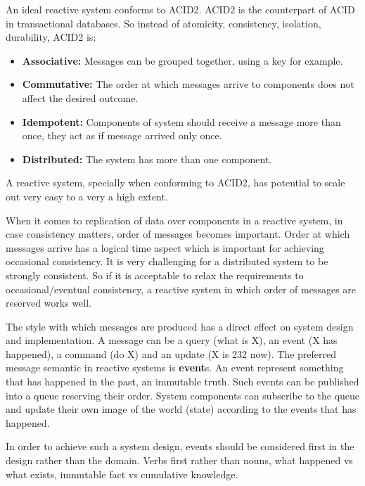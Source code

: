 \documentclass[a4]{report}
\begin{document}
    An ideal reactive system conforms to ACID2\cite{reactive-microsystems}.
    ACID2 is the counterpart of ACID in transactional databases.
    So instead of atomicity, consistency, isolation, durability, ACID2 is:
    \begin{itemize}
        \item \textbf{Associative:} Messages can be grouped together, using a key for example.
        \item \textbf{Commutative:} The order at which messages arrive to components does not affect the desired
        outcome.
        \item \textbf{Idempotent:} Components of system should receive a message more than once, they act as if message arrived only once.
        \item \textbf{Distributed:} The system has more than one component.
    \end{itemize}

    A reactive system, specially when conforming to ACID2, has potential to scale out very easy to a very a high extent.

    When it comes to replication of data over components in a reactive system, in case consistency matters, order of
    messages becomes important.
    Order at which messages arrive has a logical time aspect which is important for achieving occasional consistency.
    It is very challenging for a distributed system to be strongly consistent.
    So if it is acceptable to relax the requirements to occasional/eventual consistency, a reactive system in which
    order of messages are reserved works well.

    The style with which messages are produced has a direct effect on system design and implementation.
    A message can be a query (what is X), an event (X has happened), a command (do X) and an update (X is 232 now).
    The preferred message semantic in reactive systems is \textbf{event}s.
    An event represent something that has happened in the past, an immutable truth.
    Such events can be published into a queue reserving their order.
    System components can subscribe to the queue and update their own image of the world (state) according to the
    events that has happened.

    In order to achieve such a system design, events should be considered first in the design rather than the domain.
    Verbs first rather than nouns, what happened vs what exists, immutable fact vs cumulative knowledge.
\end{document}
